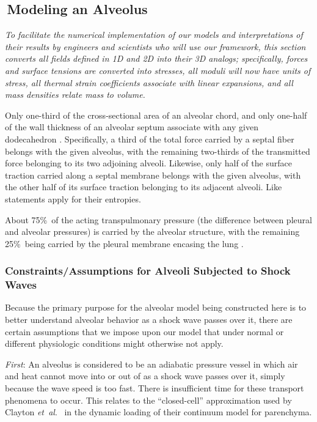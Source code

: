 \subsection{$\,$Modeling an Alveolus}
\label{secAlveolus}

\textit{To facilitate the numerical implementation of our models and interpretations of their results by engineers and scientists who will use our framework, this section converts all fields defined in 1D and 2D into their 3D analogs; specifically, forces and surface tensions are converted into stresses, all moduli will now have units of stress, all thermal strain coefficients associate with linear expansions, and all mass densities relate mass to volume.}

Only one-third of the cross-sectional area of an alveolar chord, and only one-half of the wall thickness of an alveolar septum associate with any given dodecahedron \cite{Kimmeletal87}.  Specifically, a third of the total force carried by a septal fiber belongs with the  given alveolus, with the remaining two-thirds of the transmitted force belonging to its two adjoining alveoli.  Likewise, only half of the surface traction carried along a septal membrane belongs with the given alveolus, with the other half of its surface traction belonging to its adjacent alveoli.  Like statements apply for their entropies.

About 75\%\ of the acting transpulmonary pressure (the difference between pleural and alveolar pressures) is carried by the alveolar structure, with the remaining 25\%\ being carried by the pleural membrane encasing the lung \cite{Hajjietal79}.

\subsubsection{Constraints\slash Assumptions for Alveoli Subjected to Shock Waves}

Because the primary purpose for the alveolar model being constructed here is to better understand alveolar behavior as a shock wave passes over it, there are certain assumptions that we impose upon our model that under normal or different physiologic conditions might otherwise not apply.  

\textit{First\/}: An alveolus is considered to be an adiabatic pressure vessel in which air and heat cannot move into or out of as a shock wave passes over it, simply because the wave speed is too fast.  There is insufficient time for these transport phenomena to occur.  This relates to the ``closed-cell'' approximation used by Clayton \textit{et~al}.\ \cite{ClaytonFreed20,Clayton2019TRL,Clayton2019AIP} in the dynamic loading of their continuum model for parenchyma.

